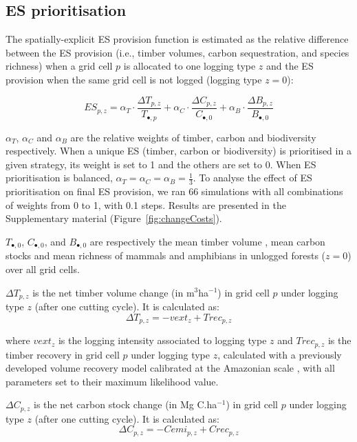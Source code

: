 \documentclass[12pt]{article}
\begin{document}
\subsection*{ES prioritisation}

The spatially-explicit ES provision function is estimated as the relative difference between the ES provision (i.e., timber volumes, carbon sequestration, and species richness) when a grid cell $p$ is allocated to one logging type $z$ and the ES provision when the same grid cell is not logged (logging type $z=0$): 

\begin{equation}
ES_{p,z} = \alpha _T \cdot \frac{\Delta T_{p,z}}{ T_{\bullet,p}} + \alpha _C \cdot \frac{\Delta C_{p,z}}{C_{\bullet,0}} + \alpha _B \cdot \frac{\Delta B_{p,z}}{B_{\bullet,0}} 
\end{equation}

$\alpha_T$, $\alpha_C$ and $\alpha_B$ are the relative weights of timber, carbon and biodiversity respectively. When a unique ES (timber, carbon or biodiversity) is prioritised in a given strategy, its weight is set to 1 and the others are set to 0. When ES prioritisation is balanced, $\alpha_T = \alpha_C = \alpha_B = \frac{1}{3}$.
To analyse the effect of ES prioritisation on final ES provision, we ran 66 simulations with all combinations of weights from 0 to 1, with 0.1 steps. Results are presented in the Supplementary material (Figure~\ref{fig:changeCosts}). 

$T_{\bullet,0}$, $C_{\bullet,0}$, and $B_{\bullet,0}$ are respectively the mean timber volume \cite{Piponiot2019}, mean carbon stocks \cite{Avitabile2016} and mean richness of mammals and amphibians \cite{Jenkins2013} in unlogged forests ($z=0$) over all grid cells. 

$\Delta T_{p,z}$ is the net timber volume change (in m$^3$ha$^{-1}$) in grid cell $p$ under logging type $z$ (after one cutting cycle). It is calculated as: 
\begin{equation}
\Delta T_{p,z} = - vext_{z} + Trec_{p,z}
\end{equation} 

where $vext_z$ is the logging intensity associated to logging type $z$ and $Trec_{p,z}$ is the timber recovery in grid cell $p$ under logging type $z$, calculated with a previously developed volume recovery model calibrated at the Amazonian scale \cite{Piponiot2019}, with all parameters set to their maximum likelihood value. 

$\Delta C_{p,z}$ is the net carbon stock change (in Mg C.ha$^{-1}$) in grid cell $p$ under logging type $z$ (after one cutting cycle). It is calculated as: 
\begin{equation}
\Delta C_{p,z} = - Cemi_{p,z} + Crec_{p,z}
\end{equation} 
\end{document}

